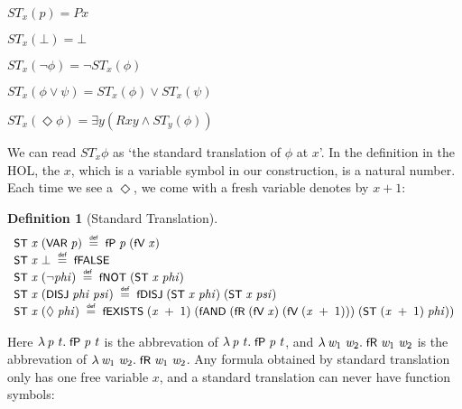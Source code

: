 \documentclass[letterpaper]{article}
\newtheorem{defn}{Definition}
\renewcommand{\HOLConst}[1]{{\textsf{\upshape\small #1}}}
\renewcommand{\HOLinline}[1]{\ensuremath{#1}}
\newenvironment{holmath}{\begin{displaymath}\begin{array}{l}}{\end{array}\end{displaymath}\ignorespacesafterend}
\begin{document}
$ST_x(p)= Px$

$ST_x(\bot)=\bot$

$ST_x(\lnot \phi)=\lnot ST_x(\phi)$

$ST_x(\phi\lor \psi) =ST_x(\phi)\lor ST_x(\psi)$

$ST_x(\Diamond\phi)=\exists y(Rxy\land ST_y(\phi))$



We can read $ST_x \phi$ as `the standard translation of $\phi$ at $x$'. In the definition in the HOL, the $x$, which is a variable symbol in our construction, is a natural number. Each time we see a $\Diamond$, we come with a fresh variable denotes by $x+1$:

\begin{defn}[Standard Translation]
\begin{holmath}
  \HOLConst{ST}\;\HOLFreeVar{x}\;(\HOLConst{VAR}\;\HOLFreeVar{p})\;\HOLSymConst{\HOLTokenDefEquality{}}\;\HOLConst{fP}\;\HOLFreeVar{p}\;(\HOLConst{fV}\;\HOLFreeVar{x})\\
\HOLConst{ST}\;\HOLFreeVar{x}\;\HOLSymConst{\ensuremath{\bot}}\;\HOLSymConst{\HOLTokenDefEquality{}}\;\HOLConst{fFALSE}\\
\HOLConst{ST}\;\HOLFreeVar{x}\;(\HOLSymConst{\HOLTokenNeg{}}\HOLFreeVar{phi})\;\HOLSymConst{\HOLTokenDefEquality{}}\;\HOLConst{fNOT}\;(\HOLConst{ST}\;\HOLFreeVar{x}\;\HOLFreeVar{phi})\\
\HOLConst{ST}\;\HOLFreeVar{x}\;(\HOLConst{DISJ}\;\HOLFreeVar{phi}\;\HOLFreeVar{psi})\;\HOLSymConst{\HOLTokenDefEquality{}}\;\HOLConst{fDISJ}\;(\HOLConst{ST}\;\HOLFreeVar{x}\;\HOLFreeVar{phi})\;(\HOLConst{ST}\;\HOLFreeVar{x}\;\HOLFreeVar{psi})\\
\HOLConst{ST}\;\HOLFreeVar{x}\;(\HOLSymConst{\ensuremath{\Diamond}}\;\HOLFreeVar{phi})\;\HOLSymConst{\HOLTokenDefEquality{}}\;\HOLConst{fEXISTS}\;(\HOLFreeVar{x}\;\HOLSymConst{\ensuremath{+}}\;\HOLNumLit{1})\;(\HOLConst{fAND}\;(\HOLConst{fR}\;(\HOLConst{fV}\;\HOLFreeVar{x})\;(\HOLConst{fV}\;(\HOLFreeVar{x}\;\HOLSymConst{\ensuremath{+}}\;\HOLNumLit{1})))\;(\HOLConst{ST}\;(\HOLFreeVar{x}\;\HOLSymConst{\ensuremath{+}}\;\HOLNumLit{1})\;\HOLFreeVar{phi}))
\end{holmath}
\end{defn}
Here \HOLinline{\HOLTokenLambda{}\HOLBoundVar{p}\;\HOLBoundVar{t}.\;\HOLConst{fP}\;\HOLBoundVar{p}\;\HOLBoundVar{t}} is the abbrevation of \HOLinline{\HOLTokenLambda{}\HOLBoundVar{p}\;\HOLBoundVar{t}.\;\HOLConst{fP}\;\HOLBoundVar{p}\;\HOLBoundVar{t}}, and \HOLinline{\HOLTokenLambda{}\HOLBoundVar{w\sb{\mathrm{1}}}\;\HOLBoundVar{w\sb{\mathrm{2}}}.\;\HOLConst{fR}\;\HOLBoundVar{w\sb{\mathrm{1}}}\;\HOLBoundVar{w\sb{\mathrm{2}}}} is the abbrevation of \HOLinline{\HOLTokenLambda{}\HOLBoundVar{w\sb{\mathrm{1}}}\;\HOLBoundVar{w\sb{\mathrm{2}}}.\;\HOLConst{fR}\;\HOLBoundVar{w\sb{\mathrm{1}}}\;\HOLBoundVar{w\sb{\mathrm{2}}}}. Any formula obtained by standard translation only has one free variable $x$, and a standard translation can never have function symbols:
\end{document}
